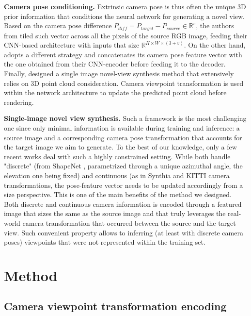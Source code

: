 \noindent\textbf{Camera pose conditioning.} Extrinsic camera pose is thus often the unique 3D prior information that conditions the neural network for generating a novel view. Based on the camera pose difference $P_{diff}=P_{target}-P_{source}\in \mathbb{R}^{v}$, the authors from \citep{sun2018multiview} tiled such vector across all the pixels of the source RGB image, feeding their CNN-based architecture with inputs that size $\mathbb{R}^{H\times W\times (3+v)}$. On the other hand, \citep{kim2020novel} adopts a different strategy and concatenates its camera pose feature vector with the one obtained from their CNN-encoder before feeding it to the decoder. 
Finally, \citep{wiles2020synsin} designed a single image novel-view synthesis method that extensively relies on 3D point cloud consideration. Camera viewpoint transformation is used within the network architecture to update the predicted point cloud before rendering. \newline

\noindent\textbf{Single-image novel view synthesis.} Such a framework is the most challenging one since only minimal information is available during training and inference: a source image and a corresponding camera pose transformation that accounts for the target image we aim to generate. To the best of our knowledge, only a few recent works \citep{sun2018multiview,kim2020novel,yu2021pixelnerf}  deal with such a highly constrained setting. While \citep{sun2018multiview, kim2020novel} both handle "discrete" (from ShapeNet \citep{chang2015shapenet}, parametrized through a unique azimuthal angle, the elevation one being fixed) and continuous (as in Synthia \citep{ros2016synthia} and KITTI \citep{geiger2012we} camera transformations, the pose-feature vector needs to be updated accordingly from a size perspective. This is one of the main benefits of the method we designed. Both discrete and continuous camera information is encoded through a featured image that sizes the same as the source image and that truly leverages the real-world camera transformation that occurred between the source and the target view. Such convenient property allows to inferring (at least with discrete camera poses) viewpoints that were not represented within the training set. \newline

\section{Method}
\subsection{Camera viewpoint transformation encoding}
